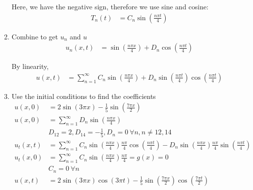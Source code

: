 \begin{enumerate}
  Here, we have the negative sign, therefore we use sine and cosine:
  \begin{align}
    T_n(t) & = C_n \sin \left( \frac{n \pi t}{4} \right)
  \end{align}
  \item Combine to get $u_n$ and $u$
  \begin{align}
    u_n(x, t)
    & = \sin\left(\frac{n \pi x}{4}\right)
    + D_n \cos \left( \frac{n \pi t}{4} \right)
  \end{align}

  By linearity,
  \begin{align}
    u(x, t)
    & = \sum^\infty_{n = 1} C_n \sin\left( \frac{n \pi x}{4} \right)
    + D_n \sin\left( \frac{n \pi t}{4} \right) \cos\left( \frac{n \pi t}{4}
    \right)
  \end{align}

  \item Use the initial conditions to find the coefficients
  \begin{align}
    u(x, 0)
    & = 2 \sin (3 \pi x) - \frac{1}{5} \sin \left( \frac{ 7 \pi x}{2} \right)\\
    u(x, 0)
    & = \sum^\infty_{n = 1} D_n \sin\left( \frac{n \pi x}{4} \right)\\
    & D_{12} = 2, D_{14} = -\frac{1}{5}, D_n = 0 \ \forall n, n \neq 12, 14\\
    u_t(x, t)
    & =
    \sum^\infty_{n = 1}
    C_n \sin\left( \frac{n \pi x}{4} \right) \frac{n \pi}{4}
    \cos\left( \frac{n \pi t}{4} \right)
    - D_n \sin\left( \frac{n \pi x}{4} \right) \frac{n \pi}{4}
    \sin\left( \frac{n \pi t}{4} \right)\\
    u_t(x, 0)
    & = \sum^\infty_{n = 1}
    C_n \sin\left( \frac{n \pi x}{4} \right) \frac{n \pi}{4} = g(x) = 0\\
    & C_n = 0 \ \forall n\\
    u(x, t)
    & = 2 \sin(3 \pi x) \cos(3 \pi t)
    - \frac{1}{5} \sin\left( \frac{7 \pi x}{2} \right)
    \cos\left( \frac{7 \pi t}{2} \right)
  \end{align}
\end{enumerate}
